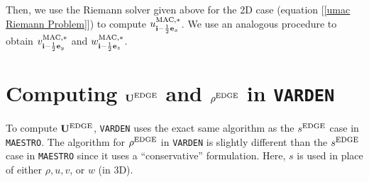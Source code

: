 Then, we use the Riemann solver given above for the 2D case (equation
[\ref{umac Riemann Problem}]) to compute
$u_{{\bf i}-\frac{1}{2}{\bf e}_x}^{\rm MAC,*}$.  We use an analogous procedure to
obtain $v_{{\bf i}-\frac{1}{2}{\bf e}_y}^{\rm MAC,*}$ and
$w_{{\bf i}-\frac{1}{2}{\bf e}_z}^{\rm MAC,*}$.

\cleardoublepage

\section{Computing ${\bf U}^{\rm EDGE}$ and $\rho^{\rm EDGE}$ in {\tt VARDEN}}
To compute ${\bf U}^{\rm EDGE}$, {\tt VARDEN} uses the exact same algorithm
as the $s^{\rm EDGE}$ case in {\tt MAESTRO}.  The algorithm for
$\rho^{\rm EDGE}$ in {\tt VARDEN} is slightly different than the
$s^{\rm EDGE}$ case in {\tt MAESTRO} since it uses a ``conservative''
formulation.  Here, $s$ is used in place of either $\rho, u, v$, or
$w$ (in 3D).

